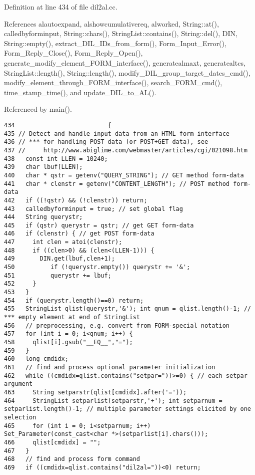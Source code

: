 Definition at line 434 of file dil2al.cc.

References alautoexpand, alshowcumulativereq, alworked, String::at(), calledbyforminput, String::chars(), String\-List::contains(), String::del(), DIN, String::empty(), extract\_\-DIL\_\-IDs\_\-from\_\-form(), Form\_\-Input\_\-Error(), Form\_\-Reply\_\-Close(), Form\_\-Reply\_\-Open(), generate\_\-modify\_\-element\_\-FORM\_\-interface(), generatealmaxt, generatealtcs, String\-List::length(), String::length(), modify\_\-DIL\_\-group\_\-target\_\-dates\_\-cmd(), modify\_\-element\_\-through\_\-FORM\_\-interface(), search\_\-FORM\_\-cmd(), time\_\-stamp\_\-time(), and update\_\-DIL\_\-to\_\-AL().

Referenced by main().



\footnotesize\begin{verbatim}434                          {
435 // Detect and handle input data from an HTML form interface
436 // *** for handling POST data (or POST+GET data), see
437 //     http://www.abiglime.com/webmaster/articles/cgi/021098.htm
438   const int LLEN = 10240;
439   char lbuf[LLEN];
440   char * qstr = getenv("QUERY_STRING"); // GET method form-data
441   char * clenstr = getenv("CONTENT_LENGTH"); // POST method form-data
442   if ((!qstr) && (!clenstr)) return;
443   calledbyforminput = true; // set global flag
444   String querystr;
445   if (qstr) querystr = qstr; // get GET form-data
446   if (clenstr) { // get POST form-data
447     int clen = atoi(clenstr);
448     if ((clen>0) && (clen<(LLEN-1))) {
449       DIN.get(lbuf,clen+1);
450          if (!querystr.empty()) querystr += '&';
451          querystr += lbuf;
452     }
453   }
454   if (querystr.length()==0) return;
455   StringList qlist(querystr,'&'); int qnum = qlist.length()-1; // *** empty element at end of StringList
456   // preprocessing, e.g. convert from FORM-special notation
457   for (int i = 0; i<qnum; i++) {
458     qlist[i].gsub("__EQ__","=");
459   }
460   long cmdidx;
461   // find and process optional parameter initialization
462   while ((cmdidx=qlist.contains("setpar="))>=0) { // each setpar argument
463     String setparstr(qlist[cmdidx].after('='));
464     StringList setparlist(setparstr,'+'); int setparnum = setparlist.length()-1; // multiple parameter settings elicited by one selection
465     for (int i = 0; i<setparnum; i++) Set_Parameter(const_cast<char *>(setparlist[i].chars()));
466     qlist[cmdidx] = "";
467   }
468   // find and process form command
469   if ((cmdidx=qlist.contains("dil2al="))<0) return;

\end{verbatim}
